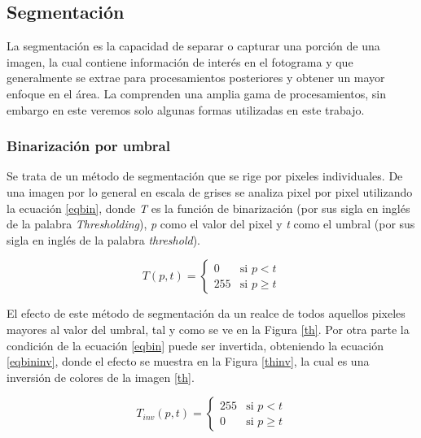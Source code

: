 \documentclass[twoside,spanish,ESP,MSc]{plantillaLabUPV}
\theoremstyle{definition}
\begin{document}
\subsection{Segmentación}
La segmentación es la capacidad de separar o capturar una porción de una imagen, la cual contiene información de interés en el fotograma y que generalmente se extrae para procesamientos posteriores y obtener un mayor enfoque en el área. La comprenden una amplia gama de procesamientos, sin embargo en este veremos solo algunas formas utilizadas en este trabajo.

\subsubsection{Binarización por umbral}
Se trata de un método de segmentación que se rige por pixeles individuales. De una imagen por lo general en escala de grises se analiza pixel por pixel utilizando la ecuación \ref{eqbin}, donde \textit{T} es la función de binarización (por sus sigla en inglés de la palabra \textit{Thresholding}), \textit{p} como el valor del pixel y \textit{t} como el umbral (por sus sigla en inglés de la palabra \textit{threshold}).

\begin{equation}\label{eqbin}
{ T(p,t) = \left \{ \begin{matrix} 0 & \mbox{si }p<t
\\ 255 & \mbox{si } p \geq t\end{matrix}\right. }
\end{equation}

El efecto de este método de segmentación da un realce de todos aquellos pixeles mayores al valor del umbral, tal y como se ve en la Figura \ref{th}. Por otra parte la condición de la ecuación \ref{eqbin} puede ser invertida, obteniendo la ecuación \ref{eqbininv}, donde el efecto se muestra en la Figura \ref{thinv}, la cual es una inversión de colores de la imagen \ref{th}. 

\begin{equation}\label{eqbininv}
{ T_{inv}(p,t) = \left \{ \begin{matrix} 255 & \mbox{si }p<t
\\ 0 & \mbox{si } p \geq t\end{matrix}\right. }
\end{equation}
\end{document}
